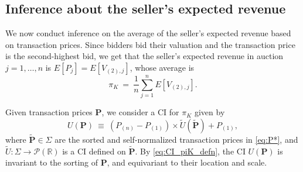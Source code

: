 
\subsection{Inference about the seller's expected revenue}
\label{sec:sp-revenue}


We now conduct inference on the average of the seller's expected revenue based on transaction prices. Since bidders bid their valuation and the transaction price is the second-highest bid, we get that the seller's expected revenue in auction $j=1,\dots,n$ is $E[P_{j}]=E[V_{(2),j}]$, whose average is
\begin{equation}
\pi _{K}~= 
~\frac{1}{n}\sum_{j=1}^{n}E[V_{(2),j}].  \label{eq:seller1}
\end{equation}

Given transaction prices $\mathbf{P}$, we consider a CI for $\pi _{K}$ given by
\begin{equation}
U(\mathbf{P})~\equiv ~( P_{(n)}-P_{(1)}) \times \tilde{U}(\mathbf{\tilde{P }}) + P_{(1)}, \label{eq:CI_piK_defn}
\end{equation}
where $\mathbf{\tilde{P}}\in \Sigma $ are the sorted and self-normalized transaction prices in \eqref{eq:P*}, and $\tilde{U}:\Sigma\to \mathcal{P}(\mathbb{R})$ is a CI defined on $\mathbf{\tilde{P}}$. By \eqref{eq:CI_piK_defn}, the CI $U(\mathbf{P})$ is invariant to the sorting of $\mathbf{P}$, and equivariant to their location and scale.

